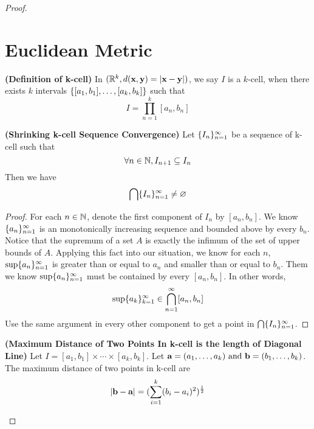 \documentclass{report}
\begin{document}
\begin{proof}
\section{Euclidean Metric}
\begin{definition}
\label{1.12.1}
\textbf{(Definition of k-cell)} In $(\mathbb{R}^k,d(\textbf{x},\textbf{y})=\left|\textbf{x}-\textbf{y}\right|)$,  we say $I$ is a $k$-cell, when there exists  $k$ intervals  $\{ [a_1,b_1],\dots , [a_k,b_k] \}$ such that
 \begin{equation}
   I=\prod_{n=1}^k [a_n,b_n]
\end{equation}
\end{definition}
\begin{lemma}
\label{1.12.2}
\textbf{(Shrinking k-cell Sequence Convergence)} Let $\{ I_n \}_{n=1}^\infty$ be a sequence of  k-cell such that 
\begin{equation}
\forall n\in\mathbb{N}, I_{n+1}\subseteq I_n
\end{equation}
Then we have
\begin{equation}
\bigcap \{ I_n \}_{n=1}^\infty\neq \varnothing
\end{equation}
\end{lemma}
\begin{proof}
For each $n\in\mathbb{N}$, denote the first component of $I_n$ by $[a_n,b_n]$. We know $\{ a_n \}_{n=1}^\infty$ is an monotonically increasing sequence  and bounded above by every $b_n$. Notice that the supremum of a set $A$ is exactly the infimum of the set of upper bounds of $A$. Applying this fact into our situation, we know for each $n$, $\sup \{ a_n \}_{n=1}^\infty$ is greater than or equal to $a_n$ and smaller than or equal to  $b_n$. Them we know $\sup \{ a_n \}_{n=1}^\infty$ must be contained by every $[a_n,b_n]$. In other words,
\begin{equation}
\sup \{ a_k \}_{k=1}^\infty\in \bigcap_{n=1}^\infty [a_n,b_n]
\end{equation}
Use the same argument in every other component to get a point in $\bigcap \{ I_n \}_{n=1}^\infty$. 
\end{proof}
\begin{lemma}
\label{1.12.3}
\textbf{(Maximum Distance of Two Points In k-cell is the length of Diagonal Line)} Let $I=[a_1,b_1]\times\cdots\times[a_k,b_k]$. Let $\textbf{a}=(a_1,\dots, a_k)\text{ and }\textbf{b}=(b_1,\dots, b_k)$. The maximum distance of two points in k-cell are 
\begin{equation}
 \left|\textbf{b}-\textbf{a}\right|= (\sum_{i=1}^k (b_i-a_i)^2)^\frac{1}{2}
\end{equation}

\end{lemma}
\end{proof}
\end{document}
